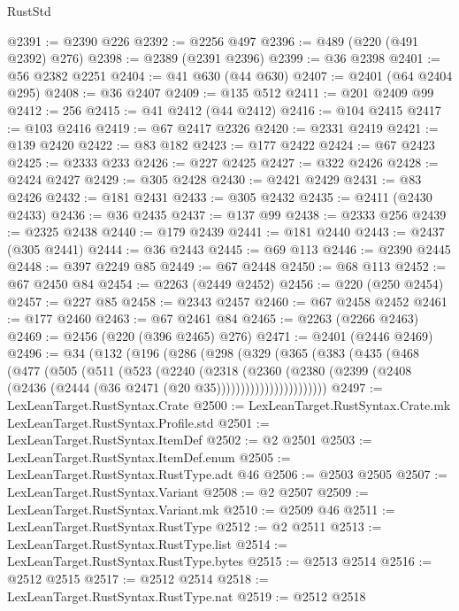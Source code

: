 \begin{lexlean}{RustStd}
\begin{coremodule}
@2391 := @2390 @226
@2392 := @2256 @497
@2396 := @489 (@220 (@491 @2392) @276)
@2398 := @2389 (@2391 @2396)
@2399 := @36 @2398
@2401 := @56 @2382 @2251
@2404 := @41 @630 (@44 @630)
@2407 := @2401 (@64 @2404 @295)
@2408 := @36 @2407
@2409 := @135 @512
@2411 := @201 @2409 @99
@2412 := 256
@2415 := @41 @2412 (@44 @2412)
@2416 := @104 @2415
@2417 := @103 @2416
@2419 := @67 @2417 @2326
@2420 := @2331 @2419
@2421 := @139 @2420
@2422 := @83 @182
@2423 := @177 @2422
@2424 := @67 @2423
@2425 := @2333 @233
@2426 := @227 @2425
@2427 := @322 @2426
@2428 := @2424 @2427
@2429 := @305 @2428
@2430 := @2421 @2429
@2431 := @83 @2426
@2432 := @181 @2431
@2433 := @305 @2432
@2435 := @2411 (@2430 @2433)
@2436 := @36 @2435
@2437 := @137 @99
@2438 := @2333 @256
@2439 := @2325 @2438
@2440 := @179 @2439
@2441 := @181 @2440
@2443 := @2437 (@305 @2441)
@2444 := @36 @2443
@2445 := @69 @113
@2446 := @2390 @2445
@2448 := @397 @2249 @85
@2449 := @67 @2448
@2450 := @68 @113
@2452 := @67 @2450 @84
@2454 := @2263 (@2449 @2452)
@2456 := @220 (@250 @2454)
@2457 := @227 @85
@2458 := @2343 @2457
@2460 := @67 @2458 @2452
@2461 := @177 @2460
@2463 := @67 @2461 @84
@2465 := @2263 (@2266 @2463)
@2469 := @2456 (@220 (@396 @2465) @276)
@2471 := @2401 (@2446 @2469)
@2496 := @34
    (@132
      (@196
        (@286
          (@298
            (@329
              (@365
                (@383
                  (@435
                    (@468
                      (@477
                        (@505
                          (@511
                            (@523
                              (@2240
                                (@2318
                                  (@2360
                                    (@2380
                                      (@2399
                                        (@2408
                                          (@2436 (@2444 (@36 @2471 (@20 @35)))))))))))))))))))))))
@2497 := LexLeanTarget.RustSyntax.Crate
@2500 := LexLeanTarget.RustSyntax.Crate.mk LexLeanTarget.RustSyntax.Profile.std
@2501 := LexLeanTarget.RustSyntax.ItemDef
@2502 := @2 @2501
@2503 := LexLeanTarget.RustSyntax.ItemDef.enum
@2505 := LexLeanTarget.RustSyntax.RustType.adt @46
@2506 := @2503 @2505
@2507 := LexLeanTarget.RustSyntax.Variant
@2508 := @2 @2507
@2509 := LexLeanTarget.RustSyntax.Variant.mk
@2510 := @2509 @46
@2511 := LexLeanTarget.RustSyntax.RustType
@2512 := @2 @2511
@2513 := LexLeanTarget.RustSyntax.RustType.list
@2514 := LexLeanTarget.RustSyntax.RustType.bytes
@2515 := @2513 @2514
@2516 := @2512 @2515
@2517 := @2512 @2514
@2518 := LexLeanTarget.RustSyntax.RustType.nat
@2519 := @2512 @2518

\end{coremodule}
\end{lexlean}
